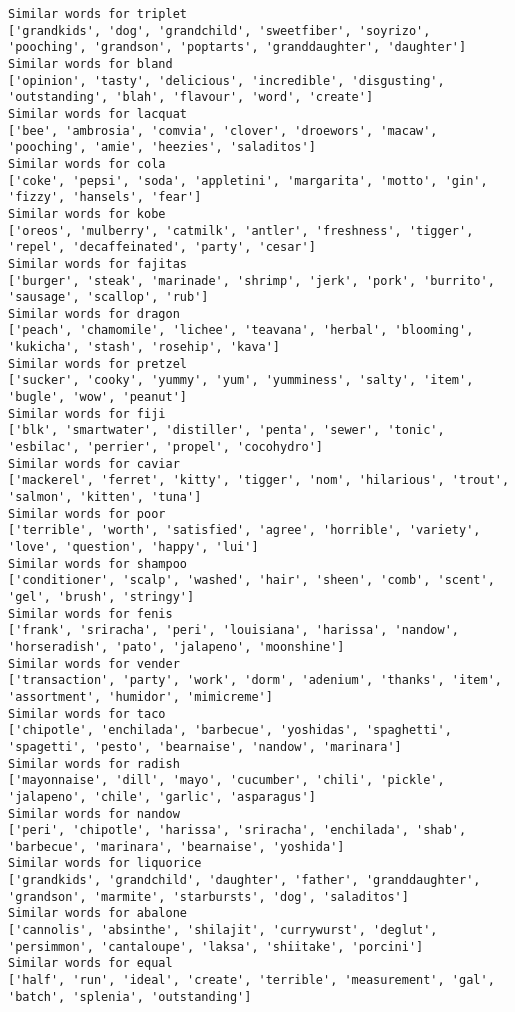 \documentclass[11pt]{article}
\begin{document}
\begin{Verbatim}[commandchars=\\\{\}]
Similar words for triplet
['grandkids', 'dog', 'grandchild', 'sweetfiber', 'soyrizo', 'pooching', 'grandson', 'poptarts', 'granddaughter', 'daughter']
Similar words for bland
['opinion', 'tasty', 'delicious', 'incredible', 'disgusting', 'outstanding', 'blah', 'flavour', 'word', 'create']
Similar words for lacquat
['bee', 'ambrosia', 'comvia', 'clover', 'droewors', 'macaw', 'pooching', 'amie', 'heezies', 'saladitos']
Similar words for cola
['coke', 'pepsi', 'soda', 'appletini', 'margarita', 'motto', 'gin', 'fizzy', 'hansels', 'fear']
Similar words for kobe
['oreos', 'mulberry', 'catmilk', 'antler', 'freshness', 'tigger', 'repel', 'decaffeinated', 'party', 'cesar']
Similar words for fajitas
['burger', 'steak', 'marinade', 'shrimp', 'jerk', 'pork', 'burrito', 'sausage', 'scallop', 'rub']
Similar words for dragon
['peach', 'chamomile', 'lichee', 'teavana', 'herbal', 'blooming', 'kukicha', 'stash', 'rosehip', 'kava']
Similar words for pretzel
['sucker', 'cooky', 'yummy', 'yum', 'yumminess', 'salty', 'item', 'bugle', 'wow', 'peanut']
Similar words for fiji
['blk', 'smartwater', 'distiller', 'penta', 'sewer', 'tonic', 'esbilac', 'perrier', 'propel', 'cocohydro']
Similar words for caviar
['mackerel', 'ferret', 'kitty', 'tigger', 'nom', 'hilarious', 'trout', 'salmon', 'kitten', 'tuna']
Similar words for poor
['terrible', 'worth', 'satisfied', 'agree', 'horrible', 'variety', 'love', 'question', 'happy', 'lui']
Similar words for shampoo
['conditioner', 'scalp', 'washed', 'hair', 'sheen', 'comb', 'scent', 'gel', 'brush', 'stringy']
Similar words for fenis
['frank', 'sriracha', 'peri', 'louisiana', 'harissa', 'nandow', 'horseradish', 'pato', 'jalapeno', 'moonshine']
Similar words for vender
['transaction', 'party', 'work', 'dorm', 'adenium', 'thanks', 'item', 'assortment', 'humidor', 'mimicreme']
Similar words for taco
['chipotle', 'enchilada', 'barbecue', 'yoshidas', 'spaghetti', 'spagetti', 'pesto', 'bearnaise', 'nandow', 'marinara']
Similar words for radish
['mayonnaise', 'dill', 'mayo', 'cucumber', 'chili', 'pickle', 'jalapeno', 'chile', 'garlic', 'asparagus']
Similar words for nandow
['peri', 'chipotle', 'harissa', 'sriracha', 'enchilada', 'shab', 'barbecue', 'marinara', 'bearnaise', 'yoshida']
Similar words for liquorice
['grandkids', 'grandchild', 'daughter', 'father', 'granddaughter', 'grandson', 'marmite', 'starbursts', 'dog', 'saladitos']
Similar words for abalone
['cannolis', 'absinthe', 'shilajit', 'currywurst', 'deglut', 'persimmon', 'cantaloupe', 'laksa', 'shiitake', 'porcini']
Similar words for equal
['half', 'run', 'ideal', 'create', 'terrible', 'measurement', 'gal', 'batch', 'splenia', 'outstanding']

\end{Verbatim}
\end{document}
